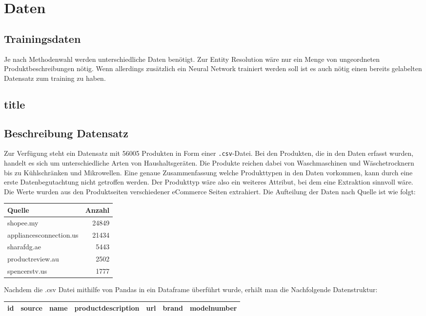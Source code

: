 \documentclass[paper=a4,12pt,listof=totoc]{scrartcl}%
\begin{document}
	\section{Daten}
	\subsection{Trainingsdaten}
	Je nach Methodenwahl werden unterschiedliche Daten benötigt. Zur Entity Resolution wäre nur ein Menge von ungeordneten Produktbeschreibungen nötig. Wenn allerdings zusätzlich ein Neural Network trainiert werden soll ist es auch nötig einen bereits gelabelten Datensatz zum training zu haben.
	\subsection{title}
	\subsection{Beschreibung Datensatz}
	Zur Verfügung steht ein Datensatz mit 56005 Produkten in Form einer \texttt{.csv}-Datei. Bei den Produkten, die in den Daten erfasst wurden, handelt es sich um unterschiedliche Arten von Haushaltsgeräten. Die Produkte reichen dabei von Waschmaschinen und Wäschetrocknern bis zu Kühlschränken und Mikrowellen. Eine genaue Zusammenfassung welche Produkttypen in den Daten vorkommen, kann durch eine erste Datenbegutachtung nicht getroffen werden. Der Produkttyp wäre also ein weiteres Attribut, bei dem eine Extraktion sinnvoll wäre. Die Werte wurden aus den Produktseiten verschiedener eCommerce Seiten extrahiert. Die Aufteilung der Daten nach Quelle ist wie folgt:\\
	
	\begin{tabular}[h]{|l|r|}
		\hline 
		Quelle & Anzahl \\ \hline 
		shopee.my&24849\\
		appliancesconnection.us&21434\\
		sharafdg.ae&5443\\
		productreview.au&2502\\
		spencerstv.us&1777\\ \hline
	\end{tabular}
	
	Nachdem die .csv Datei mithilfe von Pandas in ein Dataframe überführt wurde, erhält man die Nachfolgende Datenstruktur:\\
	\begin{tabular}[h]{|c|c|c|c|c|c|c|}
		\hline 
		id & source & name & productdescription & url & brand & modelnumber \\ \hline 
	\end{tabular}
		
\end{document}
